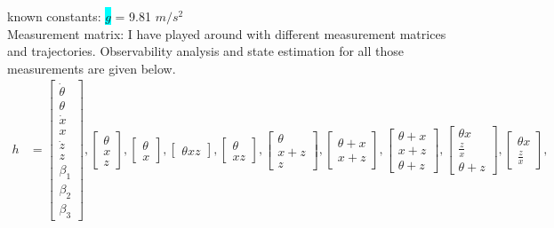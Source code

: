\documentclass[12pt]{article}
\begin{document}
known constants: \colorbox{cyan}{$g$} = 9.81 $m/s^2$ \\

Measurement matrix: I have played around with different measurement matrices and trajectories. Observability analysis and state estimation for all those measurements are given below.
\begin{align*}
    h &= \left[\begin{matrix}\dot{\theta}\\\theta\\\dot{x}\\x\\\dot{z}\\z\\\beta_{1}\\\beta_{2}\\\beta_{3}\end{matrix}\right], 
    \left[\begin{matrix}\theta\\x\\z\end{matrix}\right],
    \left[\begin{matrix}\theta\\x\end{matrix}\right], 
    \left[\begin{matrix}\theta x z\end{matrix}\right], 
    \left[\begin{matrix}\theta\\x z\end{matrix}\right],
    \left[\begin{matrix}\theta\\x + z\\z\end{matrix}\right],
    \left[\begin{matrix}\theta + x\\x + z\end{matrix}\right],
    \left[\begin{matrix}\theta + x\\x + z\\\theta + z\end{matrix}\right],
    \left[\begin{matrix}\theta x\\\frac{z}{x}\\\theta + z\end{matrix}\right],
    \left[\begin{matrix}\theta x\\\frac{z}{x}\end{matrix}\right],

\end{align*}
\end{document}
